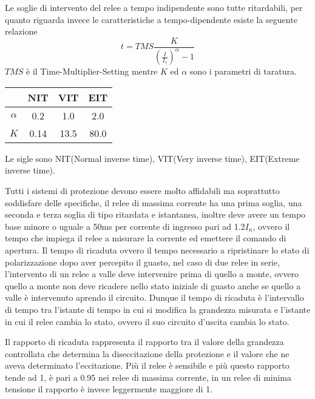 Le soglie di intervento del relee a tempo indipendente sono tutte ritardabili, per quanto riguarda invece le caratteristiche a tempo-dipendente esiste la seguente relazione
$$
t  = TMS \frac{K}{\left(\frac{I}{I_s}\right)^\alpha -1}
$$
$TMS$ è il Time-Multiplier-Setting mentre $K$ ed $\alpha$ sono i parametri di taratura.
\begin{table}[h]\centering
    \begin{tabular}{|c | c|c|c|}\hline
            & NIT & VIT & EIT \\ \hline
        $\alpha$ & 0.2 & 1.0 & 2.0 \\ \hline
        $K$ & 0.14 & 13.5 & 80.0 \\ \hline
    \end{tabular}
\end{table}
Le sigle sono NIT(Normal inverse time), VIT(Very inverse time), EIT(Extreme inverse time).

Tutti i sistemi di protezione devono essere molto affidabili ma soprattutto 
soddisfare delle specifiche, il relee di massima corrente ha una prima soglia, 
una seconda e terza soglia di tipo ritardata e istantanea, inoltre deve avere 
un tempo base minore o uguale a 50ms per corrente di ingresso pari ad 1.2$I_n$, 
ovvero il tempo che impiega il relee a misurare la corrente ed emettere il 
comando di apertura. Il tempo di ricaduta ovvero il tempo necessario a 
ripristinare lo stato di polarizzazione dopo aver percepito il guasto, nel caso 
di due relee in serie, l'intervento di un relee a valle deve intervenire prima 
di quello a monte, ovvero quello a monte non deve ricadere nello stato iniziale 
di guasto anche se quello a valle è intervenuto aprendo il circuito.
Dunque il tempo di ricaduta è l'intervallo di tempo tra l'istante di tempo in 
cui si modifica la grandezza misurata e l'istante in cui il relee cambia lo 
stato, ovvero il suo circuito d'uscita cambia lo stato.

Il rapporto di ricaduta rappresenta il rapporto tra il valore della grandezza controllata che determina la diseccitazione della protezione e il valore che ne aveva determinato l'eccitazione.
Più il relee è sensibile e più questo rapporto tende ad 1, è pari a 0.95 nei relee di massima corrente, in un relee di minima tensione il rapporto è invece leggermente maggiore di 1.

